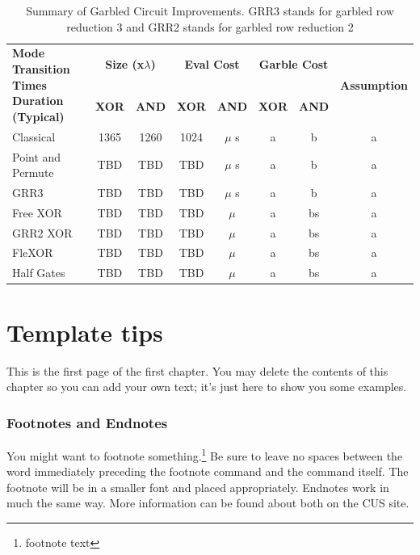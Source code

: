 \documentclass[12pt,twoside]{reedthesis}
\begin{document}
\begin{table}[h]
  \centering
  \renewcommand{\arraystretch}{1.2}
\begin{adjustbox}{width=1\textwidth}
  \begin{tabular}{|p{5cm}||c|c||c|c||c|c||c|}
    \hline
    \multirow{2}{5cm}{\centering \textbf{Mode Transition Times Duration (Typical)}} & 
    \multicolumn{2}{c|}{\textbf{Size (x$\lambda$)}} & 
    \multicolumn{2}{c|}{\textbf{Eval Cost}} & 
    \multicolumn{2}{c|}{\textbf{Garble Cost}} &
    \multirow{2}{3cm}{\centering \textbf{Assumption}} \\
    \cline{2-7}
    & \textbf{XOR} & \textbf{AND} & \textbf{XOR} & \textbf{AND}  & \textbf{XOR} & \textbf{AND} & \\
    \hline
    Classical & 1365 & 1260 & 1024 & $\mu$ s & a & b & a\\ \hline
    Point and Permute & TBD & TBD & TBD & $\mu$ s & a & b & a\\ \hline
    GRR3 & TBD & TBD & TBD & $\mu$ s  & a & b& a\\ \hline
    Free XOR & TBD & TBD & TBD & $\mu$ & a & bs& a  \\ \hline
    GRR2 XOR & TBD & TBD & TBD & $\mu$ & a & bs  & a\\ \hline
    FleXOR& TBD & TBD & TBD & $\mu$ & a & bs & a \\ \hline
    Half Gates & TBD & TBD & TBD & $\mu$ & a & bs & a \\ \hline
  \end{tabular}
  \end{adjustbox}
  \caption{Summary of Garbled Circuit Improvements. GRR3 stands for garbled row reduction 3 and GRR2 stands for garbled row reduction 2}
\end{table}


\chapter{Template tips}
This is the first page of the first chapter. You may delete the contents of this chapter so you can add your own text; it's just here to show you some examples. 
	
\subsection{Footnotes and Endnotes}
	You might want to footnote something.\footnote{footnote text} Be sure to leave no spaces between the word immediately preceding the footnote command and the command itself. The footnote will be in a smaller font and placed appropriately. Endnotes work in much the same way. More information can be found about both on the CUS site.
	
\end{document}
